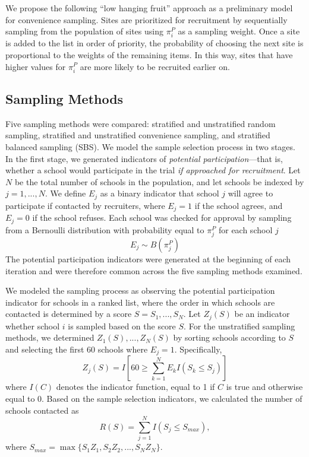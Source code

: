 \documentclass[man,floatsintext]{apa6}
\begin{document}
We propose the following \enquote{low hanging fruit} approach as a preliminary model for convenience sampling. Sites are prioritized for recruitment by sequentially sampling from the population of sites using \(\pi^P_i\) as a sampling weight. Once a site is added to the list in order of priority, the probability of choosing the next site is proportional to the weights of the remaining items. In this way, sites that have higher values for \(\pi^P_i\) are more likely to be recruited earlier on.

\hypertarget{sampling-methods}{%
\subsection{Sampling Methods}\label{sampling-methods}}

Five sampling methods were compared: stratified and unstratified random sampling, stratified and unstratified convenience sampling, and stratified balanced sampling (SBS). We model the sample selection process in two stages. In the first stage, we generated indicators of \emph{potential participation}---that is, whether a school would participate in the trial \emph{if approached for recruitment}. Let \(N\) be the total number of schools in the population, and let schools be indexed by \(j = 1, ..., N\). We define \(E_j\) as a binary indicator that school \(j\) will agree to participate if contacted by recruiters, where \(E_j = 1\) if the school agrees, and \(E_j = 0\) if the school refuses. Each school was checked for approval by sampling from a Bernoulli distribution with probability equal to \(\pi^P_j\) for each school \(j\)
\begin{equation}
\label{eq:Ej}
E_j \sim B(\pi^P_j)
\end{equation}
The potential participation indicators were generated at the beginning of each iteration and were therefore common across the five sampling methods examined.

We modeled the sampling process as observing the potential participation indicator for schools in a ranked list, where the order in which schools are contacted is determined by a score \(S = S_1,...,S_N\). Let \(Z_j(S)\) be an indicator whether school \(i\) is sampled based on the score \(S\).
For the unstratified sampling methods, we determined \(Z_1(S),...,Z_N(S)\) by sorting schools according to \(S\) and selecting the first 60 schools where \(E_j = 1\).
Specifically,
\begin{equation}
\label{eq:Zj}
Z_j(S) = I\left[60 \geq \sum_{k=1}^N E_k I\left(S_k \leq S_j\right)\right]
\end{equation}
where \(I(C)\) denotes the indicator function, equal to 1 if \(C\) is true and otherwise equal to 0. Based on the sample selection indicators, we calculated the number of schools contacted as
\begin{equation}
\label{eq:R}
R(S) = \sum_{j=1}^N I(S_j \leq S_{max}),
\end{equation}
where \(S_{max} = \max \{S_1 Z_1, S_2 Z_2, ..., S_N Z_N\}\).
\end{document}
